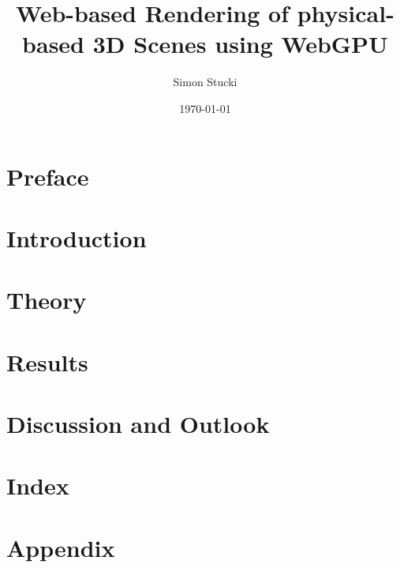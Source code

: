 \documentclass[a4paper, 11pt,abstract=on, listof=totocnumbered]{scrreprt}
\title{Web-based Rendering of physical-based 3D Scenes using WebGPU}
\author{Simon Stucki}
\date{\today}
\begin{document}
% 

\clearpage
\setcounter{page}{1}


\begin{abstract}

\end{abstract}

\chapter*{Preface}


\renewcommand{\contentsname}{Contents}
\tableofcontents

\chapter{Introduction}


\chapter{Theory}


\chapter{Results}


\chapter{Discussion and Outlook}


\chapter{Index}


\appendix
\chapter{Appendix}
\label{ch:appendix}
%
\end{document}
